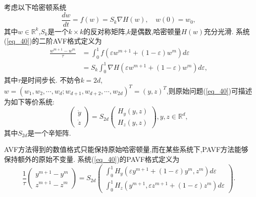 考虑以下哈密顿系统
\begin{equation}
\frac{d w}{d t}=f(w)=S_{k} \nabla H(w), \quad w(0)=w_{0},
\label{eq_40}\end{equation}
其中$w \in \mathbb{R}^{k}$,$S_{k}$是一个$k \times k$的反对称矩阵,$k$是偶数,哈密顿量$H(w)$充分光滑.
系统(\ref{eq_40})的二阶AVF格式定义为
\begin{equation}
\begin{aligned}
\frac{w^{m+1}-w^{m}}{\tau} &=\int_{0}^{1} f\left(\varepsilon w^{m+1}+(1-\varepsilon) w^{m}\right) d \varepsilon \\
&=S_{k} \int_{0}^{1} \nabla H\left(\varepsilon w^{m+1}+(1-\varepsilon) w^{m}\right) d \varepsilon,
\end{aligned}
\label{eq_41}\end{equation}
其中$\tau$是时间步长.
不妨令$k=2d$,$w=\left(w_{1}, w_{2}, \cdots, w_{d} ; w_{d+1}, w_{d+2}, \cdots, w_{2d}\right)^{T}=(y, z)^{T}$,则原始问题(\ref{eq_40})可描述为如下等价系统:
\begin{equation}
\left(\begin{array}{l}
\dot{y} \\
\dot{z}
\end{array}\right)=S_{2 d}\left(\begin{array}{c}
H_{y}(y, z) \\
H_{z}(y, z)
\end{array}\right), y, z \in \mathbb{R}^{d},
\label{eq_42}\end{equation}
其中$S_{2 d}$是一个辛矩阵.

AVF方法得到的数值格式只能保持原始哈密顿量,而在某些系统下,PAVF方法能够保持额外的原始不变量.
系统(\ref{eq_40})的PAVF格式定义为
\begin{equation}
\frac{1}{\tau}\left(\begin{array}{c}
y^{m+1}-y^{m} \\
z^{m+1}-z^{m}
\end{array}\right)=S_{2 d}\left(\begin{array}{c}
\int_{0}^{1} H_{y}\left(\varepsilon y^{m+1}+(1-\varepsilon) y^{m}, z^{m}\right) d \varepsilon \\
\int_{0}^{1} H_{z}\left(y^{m+1}, \varepsilon z^{m+1}+(1-\varepsilon) z^{m}\right) d \varepsilon
\end{array}\right) .
\label{eq_43}\end{equation}

